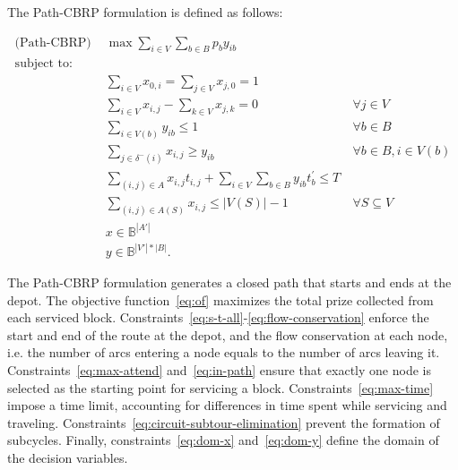 The Path-CBRP formulation is defined as follows:

\begin{align}
	\text{(Path-CBRP) }          & \max \sum_{i \in V} \sum_{b \in B} p_b y_{ib}                                             & \label{eq:of}                                                  \\
	\nonumber \text{subject to:} &                                                                                           &                                                                \\
	                             & \sum_{i \in V} x_{0,i} = \sum_{j \in V} x_{j,0} = 1                                       & \label{eq:s-t-all}                                             \\
	                             & \sum_{i \in V} x_{i,j} - \sum_{k \in V} x_{j,k} = 0                                       & \ \forall j \in V \label{eq:flow-conservation}                 \\
	                             & \sum_{i \in V(b)} y_{ib} \leq 1                                                           & \ \forall b \in B \label{eq:max-attend}                        \\
	                             & \sum_{j \in \delta^{-}(i)} x_{i,j} \geq y_{ib}                                            & \ \forall b \in B, i \in V(b) \label{eq:in-path}               \\
	                             & \sum_{(i, j) \in A} x_{i,j}t_{i,j} + \sum_{i \in V} \sum_{b \in B} y_{ib}t^{'}_{b} \leq T & \label{eq:max-time}                                            \\
	                             & \sum_{(i, j) \in A(S)} x_{i,j} \leq |V(S)| - 1                                            & \ \forall S \subseteq V \label{eq:circuit-subtour-elimination} \\	
	                             & x \in \mathbb{B}^{|A'|}                                                                   & \label{eq:dom-x}                                               \\
	                             & y \in \mathbb{B}^{|V'| * |B|}.                                                            & \label{eq:dom-y}
\end{align}


The Path-CBRP formulation generates a closed path that starts and ends at the
depot. The objective function~\eqref{eq:of} maximizes the total prize collected
from each serviced block.
Constraints~\eqref{eq:s-t-all}-\eqref{eq:flow-conservation} enforce the start
and end of the route at the depot, and the flow conservation at each node, i.e.
the number of arcs entering a node equals to the number of arcs leaving it.
Constraints~\eqref{eq:max-attend} and~\eqref{eq:in-path} ensure that exactly one
node is selected as the starting point for servicing a block.
Constraints~\eqref{eq:max-time} impose a time limit, accounting for differences
in time spent while servicing and traveling.
Constraints~\eqref{eq:circuit-subtour-elimination} prevent the
formation of subcycles. Finally, constraints~\eqref{eq:dom-x} and~\eqref{eq:dom-y}
define the domain of the decision variables.

